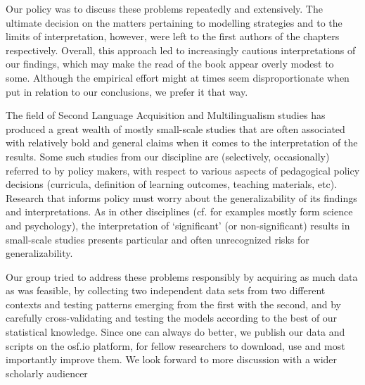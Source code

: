 \documentclass[output=paper]{langsci/langscibook}
\begin{document}
Our policy was to discuss these problems repeatedly and extensively. The ultimate decision on the matters pertaining to modelling strategies and to the limits of interpretation, however, were left to the first authors of the chapters respectively. Overall, this approach led to increasingly cautious interpretations of our findings, which may make the read of the book appear overly modest to some. Although the empirical effort might at times seem disproportionate when put in relation to our conclusions, we prefer it that way.

The field of Second Language Acquisition and Multilingualism studies has produced a great wealth of mostly small-scale studies that are often associated with relatively bold and general claims when it comes to the interpretation of the results. Some such studies from our discipline are (selectively, occasionally) referred to by policy makers, with respect to various aspects of pedagogical policy decisions (curricula, definition of learning outcomes, teaching materials, etc). Research that informs policy must worry about the generalizability of its findings and interpretations. As in other disciplines (cf. \citealt{Ritchie2020} for examples mostly form science and psychology), the interpretation of ‘significant’ (or non-significant) results in small-scale studies presents particular and often unrecognized risks for generalizability.

Our group tried to address these problems responsibly by acquiring as much data as was feasible, by collecting two independent data sets from two different contexts and testing patterns emerging from the first with the second, and by carefully cross-validating and testing the models according to the best of our statistical knowledge. Since one can always do better, we publish our data and scripts on the osf.io platform, for fellow researchers to download, use and most importantly improve them. We look forward to more discussion with a wider scholarly audiencer

{\sloppy\printbibliography[heading=subbibliography,notkeyword=this]}
\end{document}
